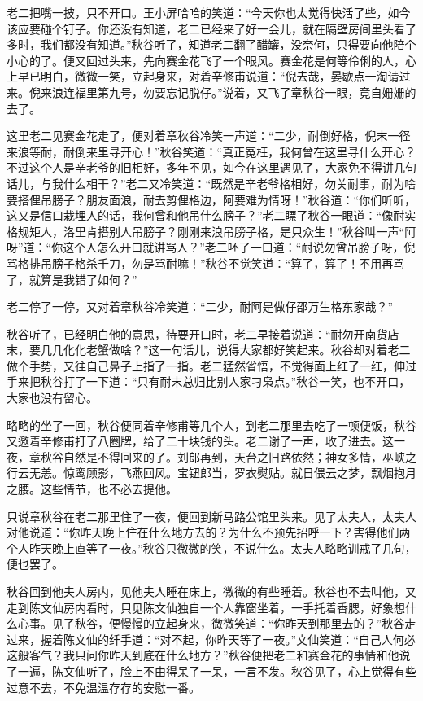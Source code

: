 \documentclass[12pt,UTF8]{ctexbook}
\begin{document}
{{{老二把嘴一披，只不开口。王小屏哈哈的笑道：“今天你也太觉得快活了些，如今该应要碰个钉子。你还没有知道，老二已经来了好一会儿，就在隔壁房间里头看了多时，我们都没有知道。”秋谷听了，知道老二翻了醋罐，没奈何，只得要向他陪个小心的了。便又回过头来，先向赛金花飞了一个眼风。赛金花是何等伶俐的人，心上早已明白，微微一笑，立起身来，对着辛修甫说道：“倪去哉，晏歇点一淘请过来。倪来浪连福里第九号，勿要忘记脱仔。”说着，又飞了章秋谷一眼，竟自姗姗的去了。

这里老二见赛金花走了，便对着章秋谷冷笑一声道：“二少，耐倒好格，倪末一径来浪等耐，耐倒来里寻开心！”秋谷笑道：“真正冤枉，我何曾在这里寻什么开心？不过这个人是辛老爷的旧相好，多年不见，如今在这里遇见了，大家免不得讲几句话儿，与我什么相干？”老二又冷笑道：“既然是辛老爷格相好，勿关耐事，耐为啥要搭俚吊膀子？朋友面浪，耐去剪俚格边，阿要难为情呀！”秋谷道：“你们听听，这又是信口栽埋人的话，我何曾和他吊什么膀子？”老二瞟了秋谷一眼道：“像耐实格规矩人，洛里肯搭别人吊膀子？刚刚来浪吊膀子格，是只众生！”秋谷叫一声“阿呀”道：“你这个人怎么开口就讲骂人？”老二呸了一口道：“耐说勿曾吊膀子呀，倪骂格排吊膀子格杀千刀，勿是骂耐嘛！”秋谷不觉笑道：“算了，算了！不用再骂了，就算是我错了如何？”

老二停了一停，又对着章秋谷冷笑道：“二少，耐阿是做仔邵万生格东家哉？”

秋谷听了，已经明白他的意思，待要开口时，老二早接着说道：“耐勿开南货店末，要几几化化老蟹做啥？”这一句话儿，说得大家都好笑起来。秋谷却对着老二做个手势，又往自己鼻子上指了一指。老二猛然省悟，不觉得面上红了一红，伸过手来把秋谷打了一下道：“只有耐末总归比别人家刁枭点。”秋谷一笑，也不开口，大家也没有留心。

略略的坐了一回，秋谷便同着辛修甫等几个人，到老二那里去吃了一顿便饭，秋谷又邀着辛修甫打了八圈牌，给了二十块钱的头。老二谢了一声，收了进去。这一夜，章秋谷自然是不得回来的了。刘郎再到，天台之旧路依然；神女多情，巫峡之行云无恙。惊鸾顾影，飞燕回风。宝钮郎当，罗衣熨贴。就日偎云之梦，飘烟抱月之腰。这些情节，也不必去提他。

只说章秋谷在老二那里住了一夜，便回到新马路公馆里头来。见了太夫人，太夫人对他说道：“你昨天晚上住在什么地方去的？为什么不预先招呼一下？害得他们两个人昨天晚上直等了一夜。”秋谷只微微的笑，不说什么。太夫人略略训戒了几句，便也罢了。

秋谷回到他夫人房内，见他夫人睡在床上，微微的有些睡着。秋谷也不去叫他，又走到陈文仙房内看时，只见陈文仙独自一个人靠窗坐着，一手托着香腮，好象想什么心事。见了秋谷，便慢慢的立起身来，微微笑道：“你昨天到那里去的？”秋谷走过来，握着陈文仙的纤手道：“对不起，你昨天等了一夜。”文仙笑道：“自己人何必这般客气？我只问你昨天到底在什么地方？”秋谷便把老二和赛金花的事情和他说了一遍，陈文仙听了，脸上不由得呆了一呆，一言不发。秋谷见了，心上觉得有些过意不去，不免温温存存的安慰一番。

}}}
\end{document}
